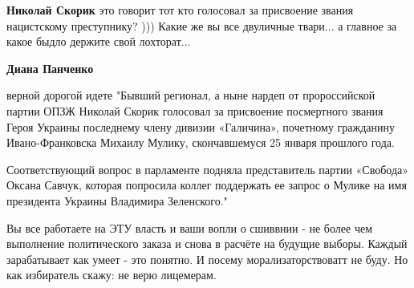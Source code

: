 \begin{itemize}
\begin{itemize}
\textbf{Николай Скорик} это говорит тот кто голосовал за присвоение звания
нацистскому преступнику? ))) Какие же вы все двуличные твари... а главное за
какое быдло держите свой лохторат...

 
\textbf{Диана Панченко} 

верной дорогой идете "Бывший регионал, а ныне нардеп от пророссийской партии
ОПЗЖ Николай Скорик голосовал за присвоение посмертного звания Героя Украины
последнему члену дивизии «Галичина», почетному гражданину Ивано-Франковска
Михаилу Мулику, скончавшемуся 25 января прошлого года.

Соответствующий вопрос в парламенте подняла представитель партии «Свобода»
Оксана Савчук, которая попросила коллег поддержать ее запрос о Мулике на имя
президента Украины Владимира Зеленского."


 

Вы все работаете на ЭТУ власть и ваши вопли о сшиввнии - не более чем
выполнение политического заказа и снова в расчёте на будущие выборы. Каждый
зарабатывает как умеет - это понятно. И посему морализаторствоватт не буду. Но
как избиратель скажу: не верю лицемерам.

\end{itemize}
\end{itemize}


